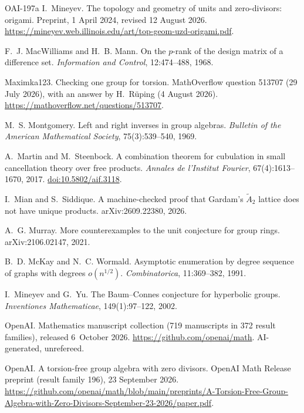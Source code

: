 \documentclass[11pt]{article}
\theoremstyle{definition}
\theoremstyle{plain}
\newcommand{\doi}[1]{\href{https://doi.org/#1}{doi:#1}}
\begin{document}
\begin{thebibliography}{OAI-197a}
I.~Mineyev.
\newblock The topology and geometry of units and zero-divisors: origami.
\newblock Preprint, 1 April 2024, revised 12 August 2026. \url{https://mineyev.web.illinois.edu/art/top-geom-uzd-origami.pdf}.

F.~J. MacWilliams and H.~B. Mann.
\newblock On the $p$-rank of the design matrix of a difference set.
\newblock \emph{Information and Control}, 12:474--488, 1968.

Maximka123.
\newblock Checking one group for torsion.
\newblock MathOverflow question 513707 (29 July 2026), with an answer by H.~R\"uping (4 August 2026). \url{https://mathoverflow.net/questions/513707}.

M.~S. Montgomery.
\newblock Left and right inverses in group algebras.
\newblock \emph{Bulletin of the American Mathematical Society}, 75(3):539--540, 1969.

A.~Martin and M.~Steenbock.
\newblock A combination theorem for cubulation in small cancellation theory over free products.
\newblock \emph{Annales de l'Institut Fourier}, 67(4):1613--1670, 2017. \doi{10.5802/aif.3118}.

I.~Mian and S.~Siddique.
\newblock A machine-checked proof that Gardam's $\widetilde A_2$ lattice does not have unique products.
\newblock arXiv:2609.22380, 2026.

A.~G. Murray.
\newblock More counterexamples to the unit conjecture for group rings.
\newblock arXiv:2106.02147, 2021.

B.~D. McKay and N.~C. Wormald.
\newblock Asymptotic enumeration by degree sequence of graphs with degrees $o(n^{1/2})$.
\newblock \emph{Combinatorica}, 11:369--382, 1991.

I.~Mineyev and G.~Yu.
\newblock The Baum--Connes conjecture for hyperbolic groups.
\newblock \emph{Inventiones Mathematicae}, 149(1):97--122, 2002.

OpenAI.
\newblock Mathematics manuscript collection (719 manuscripts in 372 result families), released 6~October 2026.
\newblock \url{https://github.com/openai/math}. AI-generated, unrefereed.

OpenAI.
\newblock A torsion-free group algebra with zero divisors.
\newblock OpenAI Math Release preprint (result family 196), 23 September 2026. \url{https://github.com/openai/math/blob/main/preprints/A-Torsion-Free-Group-Algebra-with-Zero-Divisors-September-23-2026/paper.pdf}.


\end{thebibliography}
\end{document}
